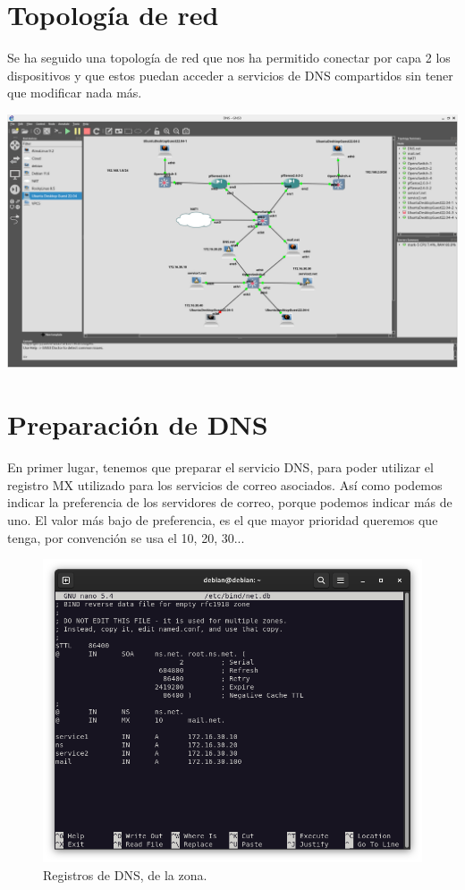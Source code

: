 \section{Topología de red}
Se ha seguido una topología de red que nos ha permitido conectar por capa 2 los dispositivos y que estos puedan acceder a servicios de DNS compartidos sin tener que modificar nada más.

\begin{turn}{90}   
    \centering
    \includegraphics[scale=0.25]{30}
\end{turn}

\newpage
\section{Preparación de DNS}

En primer lugar, tenemos que preparar el servicio DNS, para poder utilizar el registro MX utilizado para los servicios de correo asociados. Así como podemos indicar la preferencia de los servidores de correo, porque podemos indicar más de uno. El valor más bajo de preferencia, es el que mayor prioridad queremos que tenga, por convención se usa el 10, 20, 30...

\begin{figure}[H]
	\centering
	\includegraphics[scale=0.30]{00}
	\caption{Registros de DNS, de la zona.}
\end{figure}


